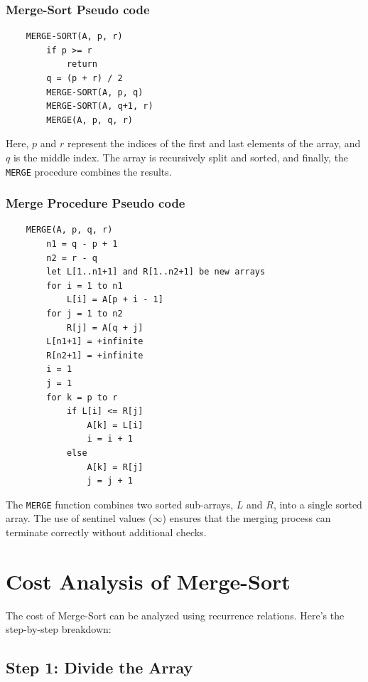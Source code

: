     \subsubsection{Merge-Sort Pseudo code}
    
    \begin{verbatim}
    MERGE-SORT(A, p, r)
        if p >= r
            return
        q = (p + r) / 2
        MERGE-SORT(A, p, q)
        MERGE-SORT(A, q+1, r)
        MERGE(A, p, q, r)
    \end{verbatim}
    
    Here, \(p\) and \(r\) represent the indices of the first and last elements of the array, and \(q\) is the middle index. The array is recursively split and sorted, and finally, the \texttt{MERGE} procedure combines the results.
    
    \subsubsection{Merge Procedure Pseudo code}
    
    \begin{verbatim}
    MERGE(A, p, q, r)
        n1 = q - p + 1
        n2 = r - q
        let L[1..n1+1] and R[1..n2+1] be new arrays
        for i = 1 to n1
            L[i] = A[p + i - 1]
        for j = 1 to n2
            R[j] = A[q + j]
        L[n1+1] = +infinite
        R[n2+1] = +infinite
        i = 1
        j = 1
        for k = p to r
            if L[i] <= R[j]
                A[k] = L[i]
                i = i + 1
            else
                A[k] = R[j]
                j = j + 1
    \end{verbatim}
    
    The \texttt{MERGE} function combines two sorted sub-arrays, \(L\) and \(R\), into a single sorted array. The use of sentinel values (\(\infty\)) ensures that the merging process can terminate correctly without additional checks.
    
    \section{Cost Analysis of Merge-Sort}
    The cost of Merge-Sort can be analyzed using recurrence relations. Here's the step-by-step breakdown:
    
    \subsection{Step 1: Divide the Array}
    
